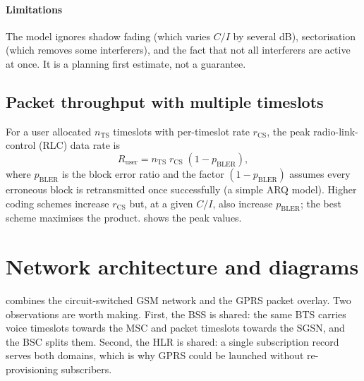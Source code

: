 \documentclass[11pt,a4paper]{article}
\begin{document}
\paragraph{Limitations} The model ignores shadow fading (which varies $C/I$ by several dB),
sectorisation (which removes some interferers), and the fact that not all
interferers are active at once. It is a planning first estimate, not a guarantee.

\begin{acnfigure}
  \caption{First-tier $C/I$ from \cref{eq:ci} versus cluster size for two path-loss
  exponents. The horizontal line marks the approximate GSM protection ratio.}
  \label{fig:reuse}
\end{acnfigure}

\subsection{Packet throughput with multiple timeslots}
For a user allocated $n_{\mathrm{TS}}$ timeslots with per-timeslot rate $r_{\mathrm{CS}}$,
the peak radio-link-control (RLC) data rate is
\begin{equation}\label{eq:gprsrate}
  R_{\mathrm{user}} = n_{\mathrm{TS}}\; r_{\mathrm{CS}}\;(1-p_{\mathrm{BLER}}),
\end{equation}
where $p_{\mathrm{BLER}}$ is the block error ratio and the factor $(1-p_{\mathrm{BLER}})$ assumes
every erroneous block is retransmitted once successfully (a simple ARQ model). Higher
coding schemes increase $r_{\mathrm{CS}}$ but, at a given $C/I$, also increase
$p_{\mathrm{BLER}}$; the best scheme maximises the product.  shows the
peak values.

\begin{acnfigure}
  \caption{Peak per-user RLC data rate versus number of timeslots ($p_{\mathrm{BLER}}=0$)
  for two GPRS and two EGPRS schemes. Real throughput is lower because of
  retransmissions, sharing among users and higher-layer overhead.}
  \label{fig:rates}
\end{acnfigure}

\section{Network architecture and diagrams}\label{sec:architecture}
 combines the circuit-switched GSM network and the GPRS packet
overlay. Two observations are worth making. First, the BSS is shared: the same BTS
carries voice timeslots towards the MSC and packet timeslots towards the SGSN, and
the BSC splits them. Second, the HLR is shared: a single subscription record serves
both domains, which is why GPRS could be launched without re-provisioning subscribers.
\end{document}
